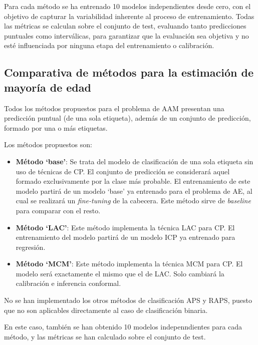 Para cada método se ha entrenado 10 modelos independientes desde cero, con el objetivo de capturar la 
variabilidad inherente al proceso de entrenamiento. 
Todas las métricas se calculan sobre el conjunto de test, evaluando tanto predicciones puntuales como
interválicas, para garantizar que la evaluación sea objetiva y no esté influenciada por ninguna etapa del
entrenamiento o calibración. 


\subsection{Comparativa de métodos para la estimación de mayoría de edad}

Todos los métodos propuestos para el problema de AAM presentan una predicción puntual (de una sola 
etiqueta), además de un conjunto de predicción, formado por una o más etiquetas. 

Los métodos propuestos son:

\begin{itemize}

\item \textbf{Método `base'}: Se trata del modelo de clasificación de una sola etiqueta sin uso de técnicas de 
CP. El conjunto de predicción se considerará aquel formado exclusivamente por la clase más probable. 
El entrenamiento de este modelo partirá de un modelo `base' ya entrenado para el problema de AE, al cual se 
realizará un \textit{fine-tuning} de la cabecera.  
Este método sirve de \textit{baseline} para comparar con el resto. 

\item \textbf{Método `LAC'}: Este método implementa la técnica LAC para CP. 
El entrenamiento del modelo partirá de un modelo ICP ya entrenado para regresión.

\item \textbf{Método `MCM'}: Este método implementa la técnica MCM para CP. 
El modelo será exactamente el mismo que el de LAC. Solo cambiará la calibración e inferencia conformal. 

\end{itemize} 

No se han implementado los otros métodos de clasificación APS y RAPS, puesto que no son aplicables 
directamente al caso de clasificación binaria.

En este caso, también se han obtenido 10 modelos indepenndientes para cada método, y las métricas 
se han calculado sobre el conjunto de test. 

